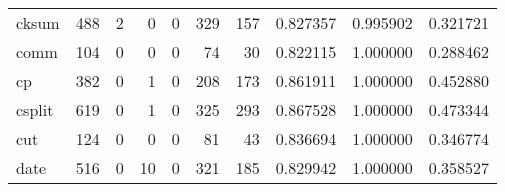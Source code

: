 \begin{longtable}{lrrrrrrrrr}
cksum     &                                   488 &                                                  2 &                                                  0 &                                                  0 &                                                329 &                                                157 &                                           0.827357 &                               0.995902 &                             0.321721 \\
comm      &                                   104 &                                                  0 &                                                  0 &                                                  0 &                                                 74 &                                                 30 &                                           0.822115 &                               1.000000 &                             0.288462 \\
cp        &                                   382 &                                                  0 &                                                  1 &                                                  0 &                                                208 &                                                173 &                                           0.861911 &                               1.000000 &                             0.452880 \\
csplit    &                                   619 &                                                  0 &                                                  1 &                                                  0 &                                                325 &                                                293 &                                           0.867528 &                               1.000000 &                             0.473344 \\
cut       &                                   124 &                                                  0 &                                                  0 &                                                  0 &                                                 81 &                                                 43 &                                           0.836694 &                               1.000000 &                             0.346774 \\
date      &                                   516 &                                                  0 &                                                 10 &                                                  0 &                                                321 &                                                185 &                                           0.829942 &                               1.000000 &                             0.358527 \\

\end{longtable}
